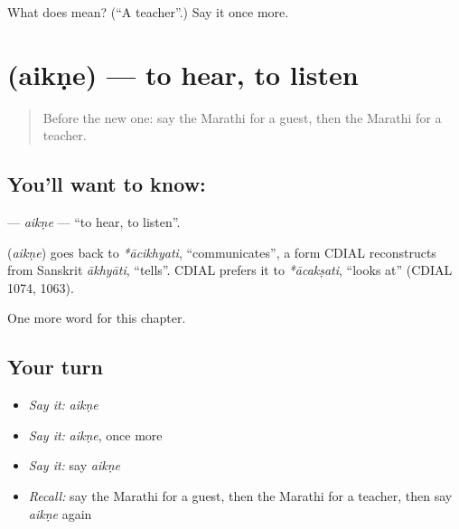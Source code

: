 \begin{tcolorbox}[breakable,colback=teal!4,colframe=teal!35!black,title={Before you move on}]
What does  mean? (\textquotedblleft{}A teacher\textquotedblright{}.) Say it once more.
\end{tcolorbox}
\section[\texorpdfstring{\mr{ऐकणे} (aikṇe)}{ऐकणे (aikṇe)}]{ (aikṇe) — to hear, to listen}

\label{lesson:MR-C77-aikne}



\begin{quote}
Before the new one: say the Marathi for a guest, then the Marathi for a teacher.
\end{quote}

\subsection*{You'll want to know: }
\textbf{} — \emph{aikṇe} — \textquotedblleft{}to hear, to listen\textquotedblright{}.

\begin{cousinweb}
\textbf{} (\emph{aikṇe}) goes back to \emph{*ācikhyati}, \textquotedblleft{}communicates\textquotedblright{}, a form CDIAL reconstructs from Sanskrit \emph{ākhyāti}, \textquotedblleft{}tells\textquotedblright{}. CDIAL prefers it to \emph{*ācakṣati}, \textquotedblleft{}looks at\textquotedblright{} (CDIAL 1074, 1063).
\end{cousinweb}

\begin{grammarlens}[title={What you've built}]
One more word for this chapter.
\end{grammarlens}

\subsection*{Your turn}
\begin{itemize}
\raggedright
  \item \emph{Say it:} \emph{aikṇe}
  \item \emph{Say it:} \emph{aikṇe}, once more
  \item \emph{Say it:} say \emph{aikṇe}
  \item \emph{Recall:} say the Marathi for a guest, then the Marathi for a teacher, then say \emph{aikṇe} again
\end{itemize}

